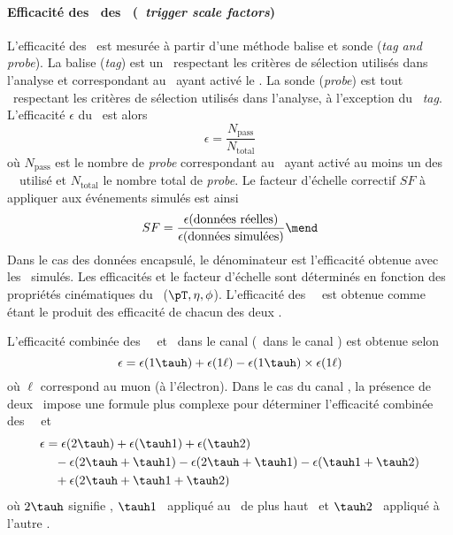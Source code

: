 \paragraph{Efficacité des \HLTpaths\ des \tauh\ (\emph{\tauh\ trigger scale factors})}
L'efficacité des \HLTpaths\ est mesurée à partir d'une méthode \og balise et sonde \fg{}  (\emph{tag and probe}).
La balise (\emph{tag}) est un \tauh\ respectant les critères de sélection utilisés dans l'analyse et correspondant au \tauh\ ayant activé le \HLTpath.
La sonde (\emph{probe}) est tout \tauh\ respectant les critères de sélection utilisés dans l'analyse, à l'exception du \tauh\ \emph{tag}.
L'efficacité $\epsilon$ du \HLTpath\ est alors
\begin{equation}
\epsilon = \frac{N_\text{pass}}{N_\text{total}}
\end{equation}
où
$N_\text{pass}$ est le nombre de \emph{probe} correspondant au \tauh\ ayant activé au moins un des \HLTpaths\ \HLTSingleTau\ utilisé
et
$N_\text{total}$ le nombre total de \emph{probe}.
Le facteur d'échelle correctif $SF$ à appliquer aux événements simulés est ainsi
\begin{equation}
SF = \frac{\epsilon(\text{données réelles})}{\epsilon(\text{données simulées})}
\mend
\end{equation}
Dans le cas des données encapsulé, le dénominateur est l'efficacité obtenue avec les \tauh\ simulés.
Les efficacités et le facteur d'échelle sont déterminés en fonction des propriétés cinématiques du \tauh\ ($\pT, \eta, \phi$).
L'efficacité des \HLTpaths\ \HLTDoubleTau\ est obtenue comme étant le produit des efficacité de chacun des deux \tauh.
\par
L'efficacité combinée des \HLTpaths\ \HLTSingleTau\ et \HLTSingleMu\ dans le canal \mu\tauh (\HLTSingleEle\ dans le canal \ele\tauh) est obtenue selon
\begin{equation}
\epsilon = \epsilon(1\tauh) + \epsilon(1\ell) - \epsilon(1\tauh) \times \epsilon(1\ell)
\end{equation}
où $\ell$ correspond au muon (à l'électron).
Dans le cas du canal \tauh\tauh, la présence de deux \tauh\ impose une formule plus complexe pour déterminer l'efficacité combinée des \HLTpaths\ \HLTSingleTau\ et \HLTDoubleTau\,
\begin{align}
\epsilon &= \epsilon(2\tauh) + \epsilon(\tauh1) + \epsilon(\tauh2)
\nonumber\\ & \hphantom{=}
- \epsilon(2\tauh + \tauh1) - \epsilon(2\tauh + \tauh1) - \epsilon(\tauh1+\tauh2)
\nonumber\\ & \hphantom{=}
+ \epsilon(2\tauh + \tauh1 + \tauh2)
\end{align}
où $2\tauh$ signifie \HLTDoubleTau,
$\tauh1$ \HLTSingleTau\ appliqué au \tauh\ de plus haut \pT\ et
$\tauh2$ \HLTSingleTau\ appliqué à l'autre \tauh.
